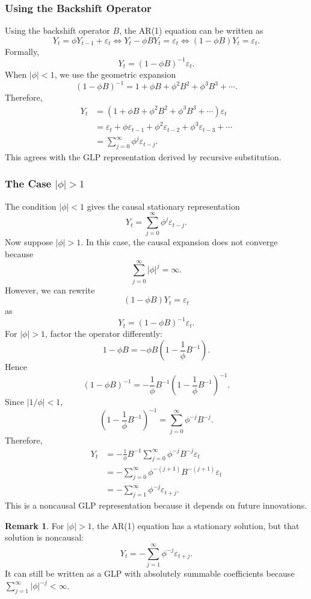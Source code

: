 \documentclass[12pt,oneside]{book}
\numberwithin{equation}{section}
\theoremstyle{definition}
\newtheorem{remark}{Remark}[section]
\theoremstyle{plain}
\theoremstyle{remark}
\begin{document}
\subsubsection*{Using the Backshift Operator}

Using the backshift operator $B$, the AR(1) equation can be written as
\[
Y_t=\phi Y_{t-1}+\varepsilon_t
\iff
Y_t-\phi BY_t=\varepsilon_t
\iff
(1-\phi B)Y_t=\varepsilon_t.
\]
Formally,
\[
Y_t=(1-\phi B)^{-1}\varepsilon_t.
\]
When $|\phi|<1$, we use the geometric expansion
\[
(1-\phi B)^{-1}
=
1+\phi B+\phi^2B^2+\phi^3B^3+\cdots.
\]
Therefore,
\begin{align*}
Y_t
&=
(1+\phi B+\phi^2B^2+\phi^3B^3+\cdots)\varepsilon_t \\
&=
\varepsilon_t+\phi\varepsilon_{t-1}+\phi^2\varepsilon_{t-2}
+\phi^3\varepsilon_{t-3}+\cdots \\
&=
\sum_{j=0}^{\infty}\phi^j\varepsilon_{t-j}.
\end{align*}
This agrees with the GLP representation derived by recursive substitution.

\subsubsection{The Case $|\phi|>1$}

The condition $|\phi|<1$ gives the causal stationary representation
\[
Y_t=\sum_{j=0}^{\infty}\phi^j\varepsilon_{t-j}.
\]
Now suppose $|\phi|>1$. In this case, the causal expansion does not converge because
\[
\sum_{j=0}^{\infty}|\phi|^j=\infty.
\]
However, we can rewrite
\[
(1-\phi B)Y_t=\varepsilon_t
\]
as
\[
Y_t=(1-\phi B)^{-1}\varepsilon_t.
\]
For $|\phi|>1$, factor the operator differently:
\[
1-\phi B
=
-\phi B\left(1-\frac{1}{\phi}B^{-1}\right).
\]
Hence
\[
(1-\phi B)^{-1}
=
-\frac{1}{\phi}B^{-1}
\left(1-\frac{1}{\phi}B^{-1}\right)^{-1}.
\]
Since $|1/\phi|<1$,
\[
\left(1-\frac{1}{\phi}B^{-1}\right)^{-1}
=
\sum_{j=0}^{\infty}\phi^{-j}B^{-j}.
\]
Therefore,
\begin{align*}
Y_t
&=
-\frac{1}{\phi}B^{-1}
\sum_{j=0}^{\infty}\phi^{-j}B^{-j}\varepsilon_t \\
&=
-\sum_{j=0}^{\infty}\phi^{-(j+1)}B^{-(j+1)}\varepsilon_t \\
&=
-\sum_{j=1}^{\infty}\phi^{-j}\varepsilon_{t+j}.
\end{align*}
This is a noncausal GLP representation because it depends on future innovations.

\begin{remark}
For $|\phi|>1$, the AR(1) equation has a stationary solution, but that solution is noncausal:
\[
Y_t=-\sum_{j=1}^{\infty}\phi^{-j}\varepsilon_{t+j}.
\]
It can still be written as a GLP with absolutely summable coefficients because $\sum_{j=1}^{\infty}|\phi|^{-j}<\infty$.
\end{remark}
\end{document}
